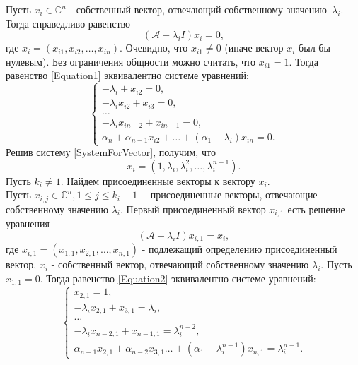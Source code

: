 Пусть $x_i \in \mathbb{C}^n$ - собственный вектор, отвечающий собственному значению~$\lambda_i$. Тогда справедливо равенство
\begin{equation}\label{Equation1}
\left(\mathcal{A}-\lambda_i I \right) x_i = 0,
\end{equation}
где $x_i = \left( x_{i1}, x_{i2}, \dots, x_{in} \right)$. Очевидно, что $x_{i1} \ne 0$ (иначе вектор $x_i$ был бы нулевым). Без ограничения общности можно считать, что $x_{i1} = 1$. Тогда равенство \eqref{Equation1} эквивалентно системе уравнений:
\begin{equation}\label{SystemForVector}
\begin{cases}
-\lambda_i + x_{i2} = 0, \\
-\lambda_i x_{i2} + x_{i3} = 0, \\
\dots \\
-\lambda_i x_{i n-2} + x_{i n-1} = 0, \\
\alpha_n + \alpha_{n-1} x_{i2} + \dots + (\alpha_1 - \lambda_i) x_{in} = 0.
\end{cases}
\end{equation}
Решив систему \eqref{SystemForVector}, получим, что 
$$
x_i = \left( 1, \lambda_i, \lambda_i ^2, \dots, \lambda_i ^{n-1} \right).
$$
Пусть $k_i \ne 1$. Найдем присоединенные векторы к вектору $x_i$. \\
Пусть $x_{i,j} \in \mathbb{C}^n,1\le j\le k_i-1$~-~присоединенные векторы, отвечающие собственному значению $\lambda_i$. Первый присоединенный вектор $x_{i,1}$ есть решение уравнения
\begin{equation}\label{Equation2}
\left(\mathcal{A}-\lambda_i I \right) x_{i,1} = x_i,
\end{equation}
где $x_{i,1} =  \left( x_{1,1}, x_{2,1}, \dots, x_{n,1} \right)$ - подлежащий определению присоединенный вектор, $x_i$ - собственный вектор, отвечающий собственному значению $\lambda_i$. Пусть $x_{1,1} = 0$. Тогда равенство \eqref{Equation2} эквивалентно системе уравнений:
\begin{equation}\label{SystemForVect}
\begin{cases}
x_{2,1} = 1, \\
-\lambda_i x_{2,1} + x_{3,1} = \lambda_i, \\
\dots \\
-\lambda_i x_{n-2,1} + x_{n-1,1} = \lambda_i ^{n-2}, \\
\alpha_{n-1} x_{2,1} + \alpha_{n-2} x_{3,1} \dots + (\alpha_1 - \lambda_i ^{n-1}) x_{n,1} = \lambda_i ^{n-1}.
\end{cases}
\end{equation}
